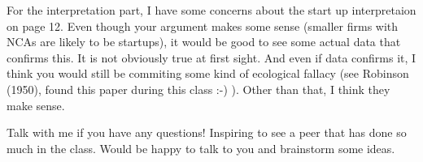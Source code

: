 \documentclass[12pt, a4paper]{article}
\begin{document}
For the interpretation part, I have some concerns about the start up interpretaion on page 12. Even though your argument makes some sense (smaller firms with NCAs are likely to be startups), it would be good to see some actual data that confirms this. It is not obviously true at first sight. And even if data confirms it, I think you would still be commiting some kind of ecological fallacy (see Robinson (1950), found this paper during this class :-) ). Other than that, I think they make sense.

Talk with me if you have any questions! Inspiring to see a peer that has done so much in the class. Would be happy to talk to you and brainstorm some ideas.
\end{document}
